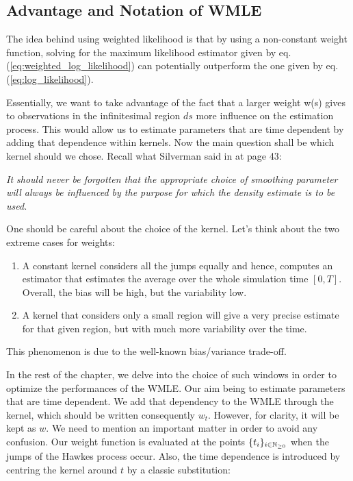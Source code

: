 \subsection{Advantage and Notation of WMLE}

The idea behind using weighted likelihood is that by using a non-constant weight function, solving for the maximum likelihood estimator given by eq. (\ref{eq:weighted_log_likelihood}) can potentially outperform the one given by eq. (\ref{eq:log_likelihood}). 

Essentially, we want to take advantage of the fact that a larger weight w(s) gives to observations in the infinitesimal region $ds$ more influence on the estimation process. This would allow us to estimate parameters that are time dependent by adding that dependence within kernels. Now the main question shall be which kernel should we chose. Recall what Silverman said in \cite{Silverman} at page 43:

\vspace{0.5cm}
\textit{It should never be forgotten that the appropriate choice of smoothing parameter will always be influenced by the purpose for which the density estimate is to be used. }
\vspace{0.5cm}

One should be careful about the choice of the kernel. Let's think about the two extreme cases for weights: 

\begin{enumerate}
\item A constant kernel considers all the jumps equally and hence, computes an estimator that estimates the average over the whole simulation time $[0,T]$. Overall, the bias will be high, but the variability low.
\item A kernel that considers only a small region will give a very precise estimate for that given region, but with much more variability over the time.
\end{enumerate}

This phenomenon is due to the well-known bias/variance trade-off.
\label{section:bias-variance_trade-off}

\label{section:kernel_weights_first_conversation}
In the rest of the chapter, we delve into the choice of such windows in order to optimize the performances of the WMLE. Our aim being to estimate parameters that are time dependent. We add that dependency to the WMLE through the kernel, which should be written consequently $w_t$. However, for clarity, it will be kept as $w$. We need to mention an important matter in order to avoid any confusion. Our weight function is evaluated at the points $\{ t_i \}_{ i \in \mathbb{N}_{\geq 0}}$ when the jumps of the Hawkes process occur. Also, the time dependence is introduced by centring the kernel around $t$ by a classic substitution: 

